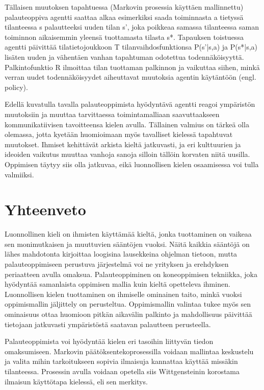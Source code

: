 \documentclass[finnish]{tktltiki2}
\theoremstyle{definition}
\theoremstyle{remark}
\begin{document}
Tällaisen muutoksen tapahtuessa (Markovin prosessia käyttäen mallinnettu) palauteoppiva agentti saattaa alkaa esimerkiksi saada toiminnasta a tietyssä tilanteessa s palautteeksi uuden tilan s’, joka poikkeaa samassa tilanteessa saman toiminnon aikaisemmin yleensä tuottamasta tilasta s*. Tapauksen toistuessa agentti päivittää tilatietojoukkoon T tilanvaihdosfunktionsa P(s’|s,a) ja P(s*|s,a) lisäten uuden ja vähentäen vanhan tapahtuman odotettua todennäköisyyttä. Palkintofunktio R ilmoittaa tilan tuottaman palkinnon ja vaikuttaa siihen, minkä verran uudet todennäköisyydet aiheuttavat muutoksia agentin käytäntöön (engl. policy).  
 
Edellä kuvatulla tavalla palauteoppimista hyödyntävä agentti reagoi ympäristön muutoksiin ja muuttaa tarvittaessa toimintamalliaan saavuttaakseen kommunikatiivisen tavoitteensa kielen avulla. Tällainen valmius on tärkeä olla olemassa, jotta kyetään huomioimaan myös tavalliset kielessä tapahtuvat muutokset. Ihmiset kehittävät arkista kieltä jatkuvasti, ja eri kulttuurien ja ideoiden vaikutus muuttaa vanhoja sanoja silloin tällöin korvaten niitä uusilla. Oppimisen täytyy siis olla jatkuvaa, eikä luonnollisen kielen osaamisessa voi tulla valmiiksi. 

\section{Yhteenveto}

Luonnollinen kieli on ihmisten käyttämää kieltä, jonka tuottaminen on vaikeaa sen monimutkaisen ja muuttuvien sääntöjen vuoksi. Näitä kaikkia sääntöjä on lähes mahdotonta kirjoittaa loogisina lausekkeina ohjelman tietoon, mutta palauteoppimiseen perustuva järjestelmä voi ne yrityksen ja erehdyksen periaatteen avulla omaksua. Palauteoppiminen on koneoppimisen tekniikka, joka hyödyntää samanlaista oppimisen mallia kuin kieltä opetteleva ihminen. Luonnollisen kielen tuottaminen on ihmiselle ominainen taito, minkä vuoksi oppimismallin jäljittely on perusteltua. Oppimismallin valintaa tukee myös sen ominaisuus ottaa huomioon pitkän aikavälin palkinto ja mahdollisuus päivittää tietojaan jatkuvasti ympäristöstä saatavan palautteen perusteella. 
 
Palauteoppimista voi hyödyntää kielen eri tasoihin liittyvän tiedon omaksumiseen. Markovin päätöksentekoprosessilla voidaan mallintaa keskustelu ja valita mihin tarkoitukseen sopivia ilmaisuja kannattaa käyttää missäkin tilanteessa. Prosessin avulla voidaan opetella siis Wittgensteinin korostama ilmaisun käyttötapa kielessä, eli sen merkitys.  
 
\end{document}
